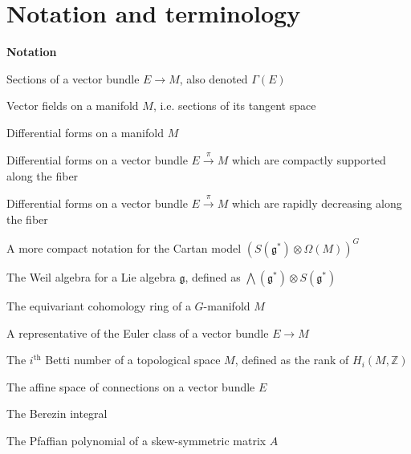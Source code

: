 

\chapter{Notation and terminology}\label{notation}

\renewcommand{\thefootnote}{\fnsymbol{footnote}}


\noindent\textbf{Notation}


\newcommand{\nttn}[2]{\item[{\ \parbox{3.18cm}{#1}}]{#2}}
\begin{list}{}{ \setlength{\leftmargin}{3.4cm}
                \setlength{\labelwidth}{3.4cm}}

\nttn{$\Gamma(M,E)$}{Sections of a vector bundle $E\to M$, also denoted $\Gamma(E)$}

\nttn{$\mathcal{X}(M)$}{Vector fields on a manifold $M$, i.e. sections of its
tangent space}

\nttn{$\Omega(M)$}{Differential forms on a manifold $M$}

\nttn{$\Omega_{cv}(E)$}{Differential forms on a vector bundle
	$E\xrightarrow{\pi} M$ which are compactly supported along the fiber}

\nttn{$\Omega_{rd}(E)$}{Differential forms on a vector bundle
	$E\xrightarrow{\pi} M$ which are rapidly decreasing along the fiber}

\nttn{$\Omega_G(M)$}{A more compact notation for the Cartan model
$(S(\mathfrak{g}^*)\otimes \Omega(M))^G$}

\nttn{$W(\mathfrak{g})$}{The Weil algebra for a Lie algebra $\mathfrak{g}$,
defined as $\bigwedge (\mathfrak{g}^*) \otimes S(\mathfrak{g}^*)$}

\nttn{$H_G(M)$}{The equivariant cohomology ring of a $G$-manifold  $M$}

\nttn{$\chi(E\to M)$ \\or $\chi(E)$}{A representative of the Euler class of a vector bundle
$E\to M$}


\nttn{$b_i$}{The $i^{\text{th}}$ Betti number of a topological space $M$, defined as
the rank of $H_i(M,\mathbb{Z})$}

\nttn{$\mathcal{A}(E)$}{The affine space of connections on a vector bundle $E$}


\nttn{$\int^B$}{The Berezin integral}


\nttn{$\Pf(A)$}{The Pfaffian polynomial of a skew-symmetric matrix $A$}

\end{list}

